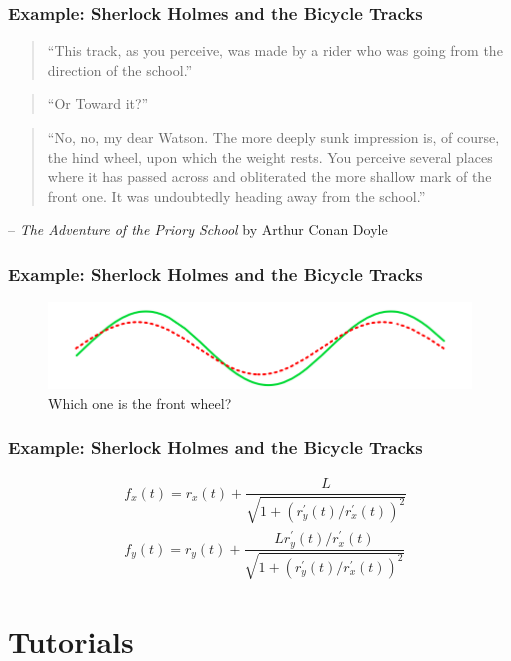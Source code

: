 \documentclass[hyperref={colorlinks=false},compress,handout,10pt]{beamer}
\begin{document}
\begin{frame}
    \frametitle{Example: Sherlock Holmes and the Bicycle Tracks}
    \begin{verse}
        ``This track, as you perceive, was made by a rider who was going from
        the direction of the school.''
    \end{verse}
    \begin{verse}
        ``Or Toward it?''
    \end{verse}
    \begin{verse}
        ``No, no, my dear Watson.  The more deeply sunk impression is, of
        course, the hind wheel, upon which the weight rests.  You perceive
        several places where it has passed across and obliterated the more
        shallow mark of the front one.  It was undoubtedly heading away from
        the school.''
    \end{verse}
    \hfill -- \textit{The Adventure of the Priory School} by Arthur Conan Doyle
\end{frame}

\begin{frame}
    \frametitle{Example: Sherlock Holmes and the Bicycle Tracks}
    \begin{figure}
        \caption{Which one is the front wheel?}
        \begin{center}
            \includegraphics[width=\textwidth]{images/sholmesbike.png}
        \end{center}
        \label{fig:sholmesbike}
    \end{figure}
\end{frame}

\begin{frame}
    \frametitle{Example: Sherlock Holmes and the Bicycle Tracks}
    \begin{align*}
        &f_x(t) = r_x(t) +
        \dfrac{L}{\sqrt{1+(r_y^\prime(t)/r_x^\prime(t))^2}}\\
        &f_y(t) = r_y(t) + \dfrac{L r_y^\prime(t)/r_x^\prime(t)}{
        \sqrt{1+ (r_y^\prime(t)/r_x^\prime(t))^2}}
    \end{align*}
\end{frame}

\section{Tutorials}
\end{document}
